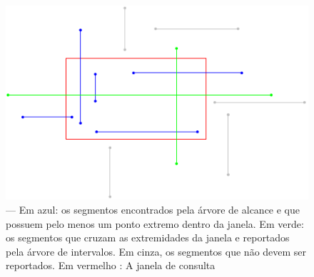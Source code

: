 \begin{figure}[h!]
    \begin{center}
        \includegraphics{images/interval_tree7.pdf}
    \end{center}
    \caption{ — Em azul: os segmentos encontrados pela árvore de alcance e que possuem pelo menos um ponto extremo dentro da janela. Em verde: os segmentos que cruzam as extremidades da janela e reportados pela árvore de intervalos. Em cinza, os segmentos que não devem ser reportados. Em vermelho : A janela de consulta}
    \label{fig:21}
\end{figure}

